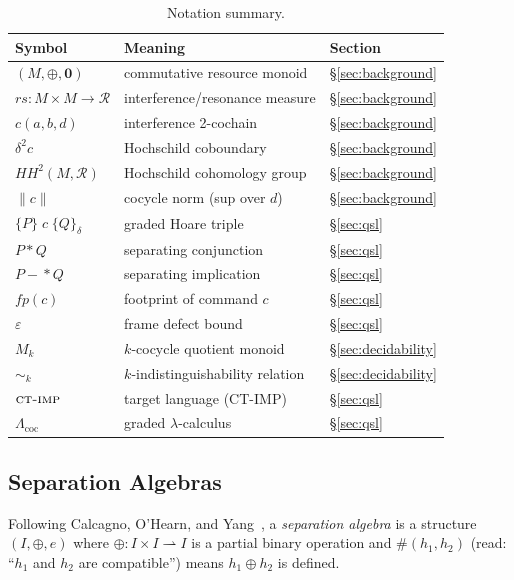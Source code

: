 \documentclass[acmsmall,sigplan,anonymous,review,screen]{acmart}
\theoremstyle{plain}
\theoremstyle{definition}
\newcommand{\CTIMP}{\textsc{ct-imp}\xspace}
\newcommand{\rs}{\mathit{rs}}
\newcommand{\fp}{\mathit{fp}}
\newcommand{\sep}{*}
\newcommand{\wand}{-\!\!*}
\newcommand{\HH}[2]{H\!H^{#1}(#2)}
\newcommand{\norm}[1]{\|#1\|}
\newcommand{\defect}{\varepsilon}
\begin{document}
\begin{table}[t]
  \caption{Notation summary.}
  \label{tab:notation}
  \centering\small
  \begin{tabular}{@{}lll@{}}
    \toprule
    Symbol & Meaning & Section \\
    \midrule
    $(M, \oplus, \mathbf{0})$ & commutative resource monoid & \S\ref{sec:background} \\
    $\rs : M \times M \to \mathcal{R}$ & interference/resonance measure & \S\ref{sec:background} \\
    $c(a,b,d)$ & interference 2-cochain & \S\ref{sec:background} \\
    $\delta^2 c$ & Hochschild coboundary & \S\ref{sec:background} \\
    $\HH{2}{M,\mathcal{R}}$ & Hochschild cohomology group & \S\ref{sec:background} \\
    $\norm{c}$ & cocycle norm (sup over $d$) & \S\ref{sec:background} \\
    $\{P\}\;c\;\{Q\}_\delta$ & graded Hoare triple & \S\ref{sec:qsl} \\
    $P \sep Q$ & separating conjunction & \S\ref{sec:qsl} \\
    $P \wand Q$ & separating implication & \S\ref{sec:qsl} \\
    $\fp(c)$ & footprint of command $c$ & \S\ref{sec:qsl} \\
    $\defect$ & frame defect bound & \S\ref{sec:qsl} \\
    $M_k$ & $k$-cocycle quotient monoid & \S\ref{sec:decidability} \\
    $\sim_k$ & $k$-indistinguishability relation & \S\ref{sec:decidability} \\
    $\CTIMP$ & target language (CT-IMP) & \S\ref{sec:qsl} \\
    $\Lambda_{\mathrm{coc}}$ & graded $\lambda$-calculus & \S\ref{sec:qsl} \\
    \bottomrule
  \end{tabular}
\end{table}

\subsection{Separation Algebras}
\label{sec:background:sepalg}

Following Calcagno, O'Hearn, and Yang~\cite{calcagno2007local}, a
\emph{separation algebra} is a structure $(I, \oplus, e)$ where
$\oplus : I \times I \rightharpoonup I$ is a partial binary operation and
$\#(h_1, h_2)$ (read: ``$h_1$ and $h_2$ are compatible'') means
$h_1 \oplus h_2$ is defined.
\end{document}
